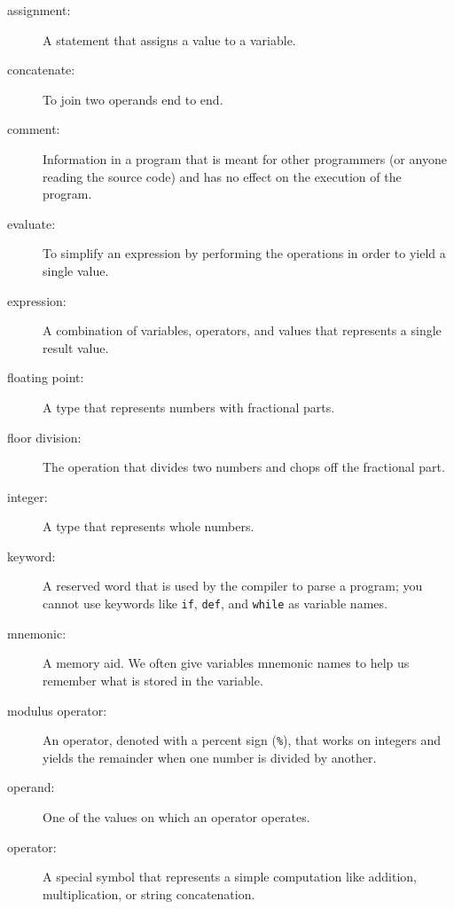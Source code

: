 \begin{description}

\item[assignment:]  A statement that assigns a value to a variable.

\item[concatenate:]  To join two operands end to end.

\item[comment:]  Information in a program that is meant for other
programmers (or anyone reading the source code) and has no effect on the
execution of the program.

\item[evaluate:]  To simplify an expression by performing the operations
in order to yield a single value.

\item[expression:]  A combination of variables, operators, and values that
represents a single result value.

\item[floating point:] A type that represents numbers with fractional
parts.

\item[floor division:] The operation that divides two numbers and chops off
the fractional part.

\item[integer:] A type that represents whole numbers.

\item[keyword:]  A reserved word that is used by the compiler to parse a
program; you cannot use keywords like {\tt if}, {\tt  def}, and {\tt while} as
variable names.

\item[mnemonic:] A memory aid. We often give variables mnemonic names
to help us remember what is stored in the variable.

\item[modulus operator:]  An operator, denoted with a percent sign
({\tt \%}), that works on integers and yields the remainder when one
number is divided by another.

\item[operand:]  One of the values on which an operator operates.

\item[operator:]  A special symbol that represents a simple computation like
addition, multiplication, or string concatenation.


\end{description}
